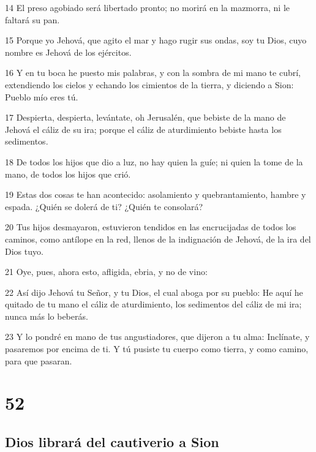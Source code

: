 \par 14 El preso agobiado será libertado pronto; no morirá en la mazmorra, ni le faltará su pan.
\par 15 Porque yo Jehová, que agito el mar y hago rugir sus ondas, soy tu Dios, cuyo nombre es Jehová de los ejércitos.
\par 16 Y en tu boca he puesto mis palabras, y con la sombra de mi mano te cubrí, extendiendo los cielos y echando los cimientos de la tierra, y diciendo a Sion: Pueblo mío eres tú.
\par 17 Despierta, despierta, levántate, oh Jerusalén, que bebiste de la mano de Jehová el cáliz de su ira; porque el cáliz de aturdimiento bebiste hasta los sedimentos.
\par 18 De todos los hijos que dio a luz, no hay quien la guíe; ni quien la tome de la mano, de todos los hijos que crió.
\par 19 Estas dos cosas te han acontecido: asolamiento y quebrantamiento, hambre y espada. ¿Quién se dolerá de ti? ¿Quién te consolará?
\par 20 Tus hijos desmayaron, estuvieron tendidos en las encrucijadas de todos los caminos, como antílope en la red, llenos de la indignación de Jehová, de la ira del Dios tuyo.
\par 21 Oye, pues, ahora esto, afligida, ebria, y no de vino:
\par 22 Así dijo Jehová tu Señor, y tu Dios, el cual aboga por su pueblo: He aquí he quitado de tu mano el cáliz de aturdimiento, los sedimentos del cáliz de mi ira; nunca más lo beberás.
\par 23 Y lo pondré en mano de tus angustiadores, que dijeron a tu alma: Inclínate, y pasaremos por encima de ti. Y tú pusiste tu cuerpo como tierra, y como camino, para que pasaran.

\chapter{52}

\section*{Dios librará del cautiverio a Sion}

